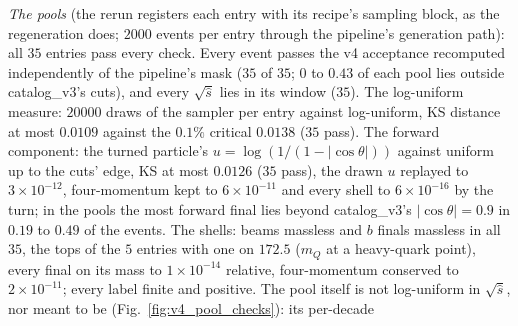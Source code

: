 \documentclass[11pt]{article}
\begin{document}
\emph{The pools} (the rerun registers each entry with its recipe's sampling block, as the regeneration does; $2000$
events per entry through the pipeline's generation path): all $35$ entries pass every check. Every event passes the
v4 acceptance recomputed independently of the pipeline's mask ($35$ of $35$; $0$ to $0.43$ of each pool lies outside
catalog\_v3's cuts), and every $\sqrt{\hat s}$ lies in its window ($35$). The log-uniform measure: $20000$ draws of the
sampler per entry against log-uniform, KS distance at most $0.0109$ against the $0.1\%$ critical $0.0138$ ($35$
pass). The forward component: the turned particle's $u=\log(1/(1-|\cos\theta|))$ against uniform up to the cuts'
edge, KS at most $0.0126$ ($35$ pass), the drawn $u$ replayed to $3\times10^{-12}$, four-momentum kept to
$6\times10^{-11}$ and every shell to $6\times10^{-16}$ by the turn; in the pools the most forward final lies beyond
catalog\_v3's $|\cos\theta|=0.9$ in $0.19$ to $0.49$ of the events. The shells: beams massless and $b$ finals
massless in all $35$, the tops of the $5$ entries with one on $172.5$ ($m_Q$ at a heavy-quark point), every final on
its mass to $1\times10^{-14}$ relative, four-momentum conserved to $2\times10^{-11}$; every label finite and positive. The
pool itself is not log-uniform in $\sqrt{\hat s}$, nor meant to be (Fig.~\ref{fig:v4_pool_checks}): its per-decade
\end{document}
